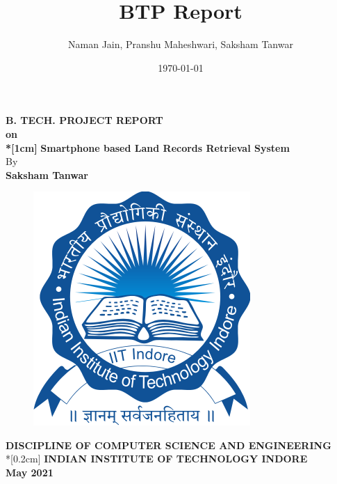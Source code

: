 \documentclass[12pt]{article}
\title{BTP Report}
\author{Naman Jain, Pranshu Maheshwari, Saksham Tanwar}
\date{\today}
\newcommand{\mainauth}{Saksham Tanwar}
\newenvironment{changemargin}[2]{%
\begin{list}{}{%
\setlength{\topsep}{0pt}%
\setlength{\leftmargin}{#1}%
\setlength{\rightmargin}{#2}%
\setlength{\listparindent}{\parindent}%
\setlength{\itemindent}{\parindent}%
\setlength{\parsep}{\parskip}%
}%
\item[]}{\end{list}}
\begin{document}

\renewcommand*{\acronymname}{Abbreviations}

\begin{titlepage}
    \begin{changemargin}{-2cm}{-2cm}
        \begin{center}
            \textbf{\Huge{B. TECH. PROJECT REPORT}\\}
            \textbf{\Huge{on}\\*[1cm]}
            \textbf{\Huge{Smartphone based Land Records Retrieval System}\\}
            \vspace{1cm}
            By\\
            \textbf{\mainauth}\\
            \vspace{2cm}

            \begin{figure}[H]
                \includegraphics[scale=0.5]{iiti_logo}
                \centering
            \end{figure}
            \vspace{2.5cm}
            \textbf{\large{DISCIPLINE OF COMPUTER SCIENCE AND ENGINEERING}}\\*[0.2cm]
            \textbf{\LARGE{INDIAN INSTITUTE OF TECHNOLOGY INDORE}}\\
            \textbf{\large{May 2021}}
        \end{center}
    \end{changemargin}
\end{titlepage}
\clearpage
\end{document}
